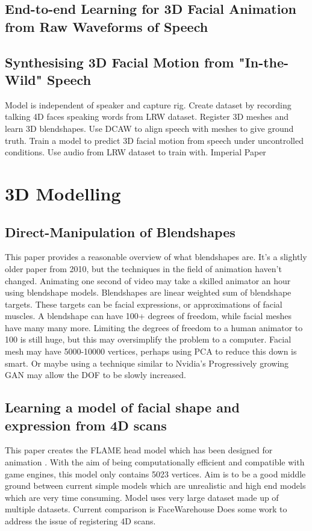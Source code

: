 \documentclass[12pt]{article}
\begin{document}
\subsection{End-to-end Learning for 3D Facial Animation from Raw Waveforms of Speech}
\cite{Pham2017}

\subsection{Synthesising 3D Facial Motion from "In-the-Wild" Speech}
Model is independent of speaker and capture rig.
Create dataset by recording talking 4D faces speaking words from LRW dataset.
Register 3D meshes and learn 3D blendshapes.
Use DCAW to align speech with meshes to give ground truth.
Train a model to predict 3D facial motion from speech under uncontrolled conditions. 
Use audio from LRW dataset to train with.
Imperial Paper \cite{Tzirakis2019}


\section{3D Modelling}
\subsection{Direct-Manipulation of Blendshapes}
This paper \cite{Lewis2010} provides a reasonable overview of what blendshapes are.
It's a slightly older paper from 2010, but the techniques in the field of animation haven't changed.
Animating one second of video may take a skilled animator an hour using blendshape models.
Blendshapes are linear weighted sum of blendshape targets.
These targets can be facial expressions, or approximations of facial muscles.
A blendshape can have 100+ degrees of freedom, while facial meshes have many many more.
Limiting the degrees of freedom to a human animator to 100 is still huge, but this may oversimplify the problem to a computer.
Facial mesh may have 5000-10000 vertices, perhaps using PCA to reduce this down is smart.
Or maybe using a technique similar to Nvidia's Progressively growing GAN \cite{Karras2017b} may allow the DOF to be slowly increased.

\subsection{Learning a model of facial shape and expression from 4D scans}
This paper creates the FLAME head model which has been designed for animation \cite{Li2017}.
With the aim of being computationally efficient and compatible with game engines, this model only contains 5023 vertices.
Aim is to be a good middle ground between current simple models which are unrealistic and high end models which are very time consuming.
Model uses very large dataset made up of multiple datasets.
Current comparison is FaceWarehouse
Does some work to address the issue of registering 4D scans.
\end{document}

